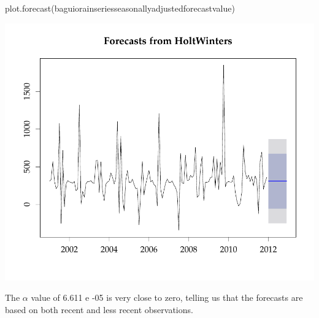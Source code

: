 \documentclass{article}\usepackage{graphicx, color}
\begin{document}
\begin{center}
\begin{Schunk}
\begin{Sinput}
plot.forecast(baguiorainseriesseasonallyadjustedforecastvalue)
\end{Sinput}

\includegraphics[width=.7\textwidth]{figure/listings-ForecastAdjusted} \end{Schunk}

\end{center}

The $\alpha$ value of \num{6.611 e -05} is very close to zero, telling us that the forecasts are based on both recent and less recent observations.
\end{document}
